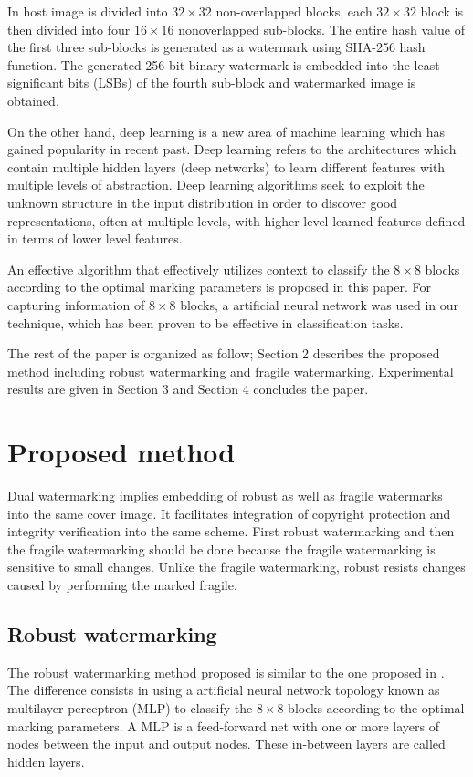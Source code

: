 \documentclass[runningheads]{llncs}
\begin{document}
In \cite{gul2019novel} host image is divided into $32\times 32$ non-overlapped blocks, each $32\times 32$ block is then divided into four $16\times 16$ nonoverlapped sub-blocks. The entire hash value of the first three sub-blocks is generated as a watermark using SHA-256 hash function. The generated 256-bit binary watermark is embedded into the least significant bits (LSBs) of the fourth sub-block and watermarked image is obtained.

On the other hand, deep learning is a new area of machine learning which has gained popularity in recent past. Deep learning refers to the architectures which contain multiple hidden layers (deep networks) to learn different features with multiple levels of abstraction. Deep learning algorithms seek to exploit the unknown structure in the input distribution in order to discover good representations, often at multiple levels, with higher level learned features defined in terms of lower level features. \cite{wani2019advances}

An effective algorithm that effectively utilizes context to classify the $8\times 8$ blocks according to the optimal marking parameters is proposed in this paper. For capturing information of $8\times 8$ blocks, a artificial neural network was used in our technique, which has been proven to be effective in classification tasks.

The rest of the paper is organized as follow; Section 2 describes the proposed method including robust watermarking and fragile watermarking. Experimental results are given in Section 3 and Section 4 concludes the paper.

\section{Proposed method}
Dual watermarking implies embedding of robust as well as fragile watermarks into the same cover image. It facilitates integration of copyright protection and integrity verification into the same scheme. First robust watermarking and then the fragile watermarking should be done because the fragile watermarking is sensitive to small changes. Unlike the fragile watermarking, robust resists changes caused by performing the marked fragile.

\subsection{Robust watermarking}
The robust watermarking method proposed is similar to the one proposed in \cite{avila2018watermarking}. The difference consists in using a artificial neural network topology known as multilayer perceptron (MLP) to classify the $8\times 8$ blocks according to the optimal marking parameters. A MLP is a feed-forward net with one or more layers of nodes between the input and output nodes. These in-between layers are called hidden layers.
\end{document}
